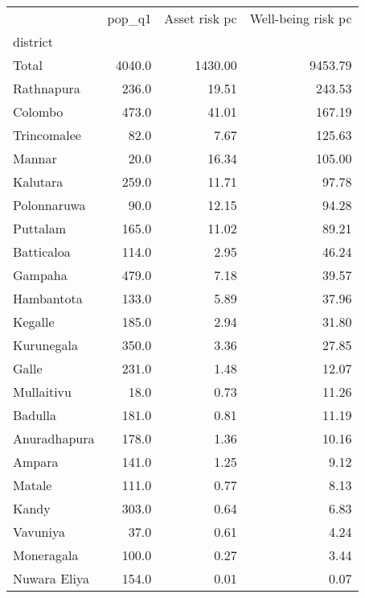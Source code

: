 \begin{tabular}{lrrr}
\toprule
{} &  pop\_q1 &  Asset risk pc &  Well-being risk pc \\
district     &         &                &                     \\
\midrule
Total        &  4040.0 &        1430.00 &             9453.79 \\
Rathnapura   &   236.0 &          19.51 &              243.53 \\
Colombo      &   473.0 &          41.01 &              167.19 \\
Trincomalee  &    82.0 &           7.67 &              125.63 \\
Mannar       &    20.0 &          16.34 &              105.00 \\
Kalutara     &   259.0 &          11.71 &               97.78 \\
Polonnaruwa  &    90.0 &          12.15 &               94.28 \\
Puttalam     &   165.0 &          11.02 &               89.21 \\
Batticaloa   &   114.0 &           2.95 &               46.24 \\
Gampaha      &   479.0 &           7.18 &               39.57 \\
Hambantota   &   133.0 &           5.89 &               37.96 \\
Kegalle      &   185.0 &           2.94 &               31.80 \\
Kurunegala   &   350.0 &           3.36 &               27.85 \\
Galle        &   231.0 &           1.48 &               12.07 \\
Mullaitivu   &    18.0 &           0.73 &               11.26 \\
Badulla      &   181.0 &           0.81 &               11.19 \\
Anuradhapura &   178.0 &           1.36 &               10.16 \\
Ampara       &   141.0 &           1.25 &                9.12 \\
Matale       &   111.0 &           0.77 &                8.13 \\
Kandy        &   303.0 &           0.64 &                6.83 \\
Vavuniya     &    37.0 &           0.61 &                4.24 \\
Moneragala   &   100.0 &           0.27 &                3.44 \\
Nuwara Eliya &   154.0 &           0.01 &                0.07 \\
\bottomrule
\end{tabular}
